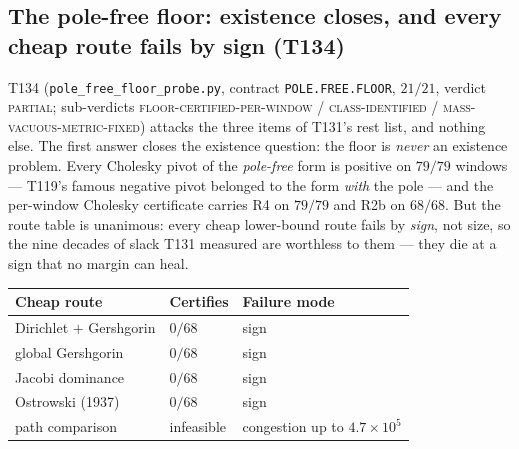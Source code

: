 \documentclass[11pt,a4paper]{article}
\begin{document}
\subsection{The pole-free floor: existence closes, and every cheap route fails by sign (T134)}
T134 (\texttt{pole\_free\_floor\_probe.py}, contract \texttt{POLE.FREE.FLOOR}, $21/21$,
verdict \textsc{partial}; sub-verdicts \textsc{floor-certified-per-window} /
\textsc{class-identified} / \textsc{mass-vacuous-metric-fixed}) attacks the three items of
T131's rest list, and nothing else. The first answer closes the existence question: the
floor is \emph{never} an existence problem. Every Cholesky pivot of the \emph{pole-free}
form is positive on $79/79$ windows --- T119's famous negative pivot belonged to the form
\emph{with} the pole --- and the per-window Cholesky certificate carries R4 on $79/79$ and
R2b on $68/68$. But the route table is unanimous: every cheap lower-bound route fails by
\emph{sign}, not size, so the nine decades of slack T131 measured are worthless to them ---
they die at a sign that no margin can heal.

\begin{center}
{\small
\begin{tabular}{@{}lll@{}}
\toprule
\textbf{Cheap route} & \textbf{Certifies} & \textbf{Failure mode}\\
\midrule
Dirichlet $+$ Gershgorin & $0/68$ & sign\\
global Gershgorin & $0/68$ & sign\\
Jacobi dominance & $0/68$ & sign\\
Ostrowski (1937) & $0/68$ & sign\\
path comparison & infeasible & congestion up to $4.7\times10^{5}$\\
\bottomrule
\end{tabular}}
\end{center}
\end{document}
